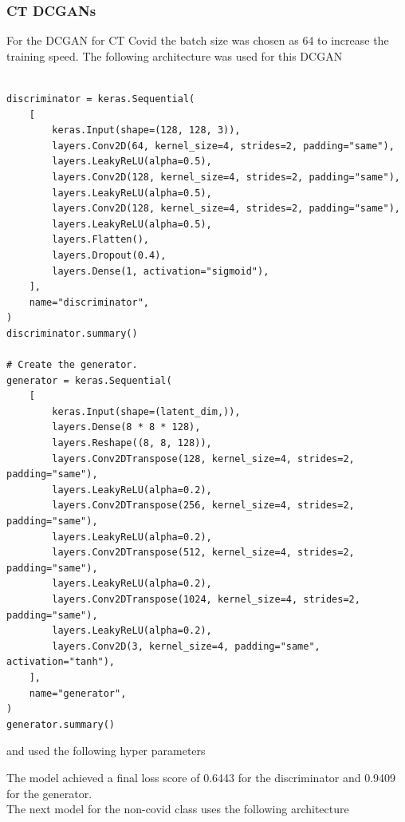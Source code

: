\subsubsection{CT DCGANs}
For the DCGAN for CT Covid the batch size was chosen as 64 to increase the training speed.  The following architecture was used for this DCGAN
\begin{verbatim}

discriminator = keras.Sequential(
    [
        keras.Input(shape=(128, 128, 3)),
        layers.Conv2D(64, kernel_size=4, strides=2, padding="same"),
        layers.LeakyReLU(alpha=0.5),
        layers.Conv2D(128, kernel_size=4, strides=2, padding="same"),
        layers.LeakyReLU(alpha=0.5),
        layers.Conv2D(128, kernel_size=4, strides=2, padding="same"),
        layers.LeakyReLU(alpha=0.5),
        layers.Flatten(),
        layers.Dropout(0.4),
        layers.Dense(1, activation="sigmoid"),
    ],
    name="discriminator",
)
discriminator.summary()

# Create the generator.
generator = keras.Sequential(
    [
        keras.Input(shape=(latent_dim,)),
        layers.Dense(8 * 8 * 128),
        layers.Reshape((8, 8, 128)),
        layers.Conv2DTranspose(128, kernel_size=4, strides=2, padding="same"),
        layers.LeakyReLU(alpha=0.2),
        layers.Conv2DTranspose(256, kernel_size=4, strides=2, padding="same"),
        layers.LeakyReLU(alpha=0.2),
        layers.Conv2DTranspose(512, kernel_size=4, strides=2, padding="same"),
        layers.LeakyReLU(alpha=0.2),
        layers.Conv2DTranspose(1024, kernel_size=4, strides=2, padding="same"),
        layers.LeakyReLU(alpha=0.2),
        layers.Conv2D(3, kernel_size=4, padding="same", activation="tanh"),
    ],
    name="generator",
)
generator.summary()
\end{verbatim}
and used the following hyper parameters
\begin{table}[H]
    \centering
    \caption{DCGAN for Producing Synthetic CT COVID Class Data for Extensive COVID 19 Dataset}
    \label{tab:DCGAN for Producing Synthetic CT COVID Class Data for Extensive COVID 19 Dataset}
\end{table}
The model achieved a final loss score of 0.6443 for the discriminator and 0.9409 for the generator.
\\
The next model for the non-covid class uses the following architecture

